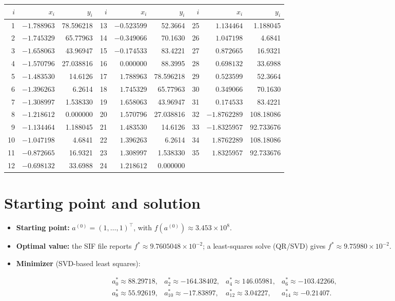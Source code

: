 \documentclass[11pt]{article}
\begin{document}
\begin{center}
\small
\begin{tabular}{rrr@{\qquad}rrr@{\qquad}rrr}
\toprule
$i$ & $x_i$ & $y_i$ & $i$ & $x_i$ & $y_i$ & $i$ & $x_i$ & $y_i$\\
\midrule
1  & $-1.788963$ & 78.596218 & 13 & $-0.523599$ & 52.3664   & 25 & $1.134464$ & 1.188045 \\
2  & $-1.745329$ & 65.77963  & 14 & $-0.349066$ & 70.1630   & 26 & $1.047198$ & 4.6841 \\
3  & $-1.658063$ & 43.96947  & 15 & $-0.174533$ & 83.4221   & 27 & $0.872665$ & 16.9321 \\
4  & $-1.570796$ & 27.038816 & 16 & $0.000000$  & 88.3995   & 28 & $0.698132$ & 33.6988 \\
5  & $-1.483530$ & 14.6126   & 17 & $1.788963$  & 78.596218 & 29 & $0.523599$ & 52.3664 \\
6  & $-1.396263$ & 6.2614    & 18 & $1.745329$  & 65.77963  & 30 & $0.349066$ & 70.1630 \\
7  & $-1.308997$ & 1.538330  & 19 & $1.658063$  & 43.96947  & 31 & $0.174533$ & 83.4221 \\
8  & $-1.218612$ & 0.000000  & 20 & $1.570796$  & 27.038816 & 32 & $-1.8762289$ & 108.18086 \\
9  & $-1.134464$ & 1.188045  & 21 & $1.483530$  & 14.6126   & 33 & $-1.8325957$ & 92.733676 \\
10 & $-1.047198$ & 4.6841    & 22 & $1.396263$  & 6.2614    & 34 & $1.8762289$  & 108.18086 \\
11 & $-0.872665$ & 16.9321   & 23 & $1.308997$  & 1.538330  & 35 & $1.8325957$  & 92.733676 \\
12 & $-0.698132$ & 33.6988   & 24 & $1.218612$  & 0.000000  &    &              & \\
\bottomrule
\end{tabular}
\end{center}

\section{Starting point and solution}
\begin{itemize}
  \item \textbf{Starting point:} $a^{(0)}=(1,\dots,1)^\top$, with
        $f(a^{(0)})\approx 3.453\times 10^{8}$.
  \item \textbf{Optimal value:} the SIF file reports $f^*\approx 9.7605048\times10^{-2}$;
        a least-squares solve (QR/SVD) gives $f^*\approx 9.75980\times10^{-2}$.
  \item \textbf{Minimizer} (SVD-based least squares):
\end{itemize}
\[
\begin{array}{llll}
a_0^*\approx 88.29718, & a_2^*\approx -164.38402, & a_4^*\approx 146.05981, & a_6^*\approx -103.42266,\\[2pt]
a_8^*\approx 55.92619, & a_{10}^*\approx -17.83897, & a_{12}^*\approx 3.04227, & a_{14}^*\approx -0.21407.
\end{array}
\]
\end{document}
